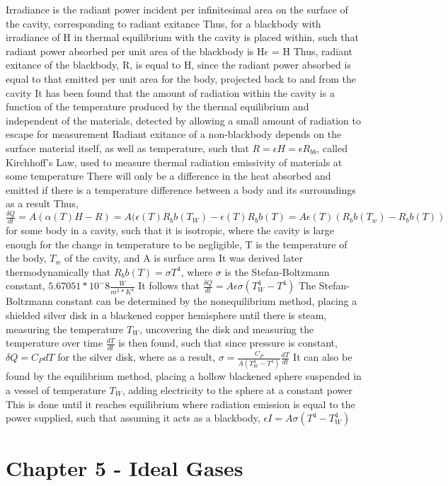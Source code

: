 \documentclass[11 pt, twoside]{article}
\newenvironment{outline*}
{
	\begin{outline}[enumerate]
	}
	{\end{outline}
}
\begin{document}
\begin{outline*}
\2 Irradiance is the radiant power incident per infinitesimal area on the surface of the cavity, corresponding to radiant exitance
\3 Thus, for a blackbody with irradiance of H in thermal equilibrium with the cavity is placed within, such that radiant power absorbed per unit area of the blackbody is H$\epsilon$ = H
\3 Thus, radiant exitance of the blackbody, R, is equal to H, since the radiant power absorbed is equal to that emitted per unit area for the body, projected back to and from the cavity
\2 It has been found that the amount of radiation within the cavity is a function of the temperature produced by the thermal equilibrium and independent of the materials, detected by allowing a small amount of radiation to escape for measurement
\2 Radiant exitance of a non-blackbody depends on the surface material itself, as well as temperature, such that $R = \epsilon H = \epsilon R_{bb}$, called Kirchhoff's Law, used to measure thermal radiation emissivity of materials at some temperature
\2 There will only be a difference in the heat absorbed and emitted if there is a temperature difference between a body and its surroundings as a result
\3 Thus, $\frac{\delta Q}{dt} = A(\alpha(T) H - R) = A(\epsilon(T) R_bb(T_W) - \epsilon(T) R_bb(T) = A\epsilon(T)(R_bb(T_w) - R_bb(T))$ for some body in a cavity, such that it is isotropic, where the cavity is large enough for the change in temperature to be negligible, T is the temperature of the body, $T_w$ of the cavity, and A is surface area
\2 It was derived later thermodynamically that $R_bb(T) = \sigma T^4$, where $\sigma$ is the Stefan-Boltzmann constant, $5.67051 * 10^-8 \frac{W}{m^2 * K^4}$
\3 It follows that $\frac{\delta Q}{dt} = A\epsilon\sigma(T_W^4 - T^4)$
\3 The Stefan-Boltzmann constant can be determined by the nonequilibrium method, placing a shielded silver disk in a blackened copper hemisphere until there is steam, measuring the temperature $T_W$, uncovering the disk and measuring the temperature over time
\4 $\frac{dT}{dt}$ is then found, such that since pressure is constant, $\delta Q = C_P dT$ for the silver disk, where as a result, $\sigma = \frac{C_P}{A(T_W^4 - T^4)}\frac{dT}{dt}$
\3 It can also be found by the equilibrium method, placing a hollow blackened sphere suspended in a vessel of temperature $T_W$, adding electricity to the sphere at a constant power
\4 This is done until it reaches equilibrium where radiation emission is equal to the power supplied, such that assuming it acts as a blackbody, $\epsilon I = A\sigma(T^4 - T_W^4)$
\end{outline*}
\section{Chapter 5 - Ideal Gases}
\end{document}
